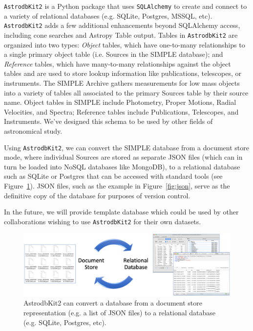 \documentclass[11pt,twoside]{article}
\begin{document}
 \texttt{AstrodbKit2} is a Python package that uses \texttt{SQLAlchemy} to create and connect to a variety of relational databases (e.g. SQLite, Postgres, MSSQL, etc). 
 \texttt{AstrodbKit2} adds a few additional enhancements beyond SQLAlchemy access, including cone searches and Astropy Table output.
 Tables in \texttt{AstrodbKit2} are organized into two types: \textit{Object} tables, which have one-to-many relationships to a single primary object table (i.e. Sources in the SIMPLE database); and \textit{Reference} tables, which have many-to-many relationships against the object tables and are used to store lookup information like publications, telescopes, or instruments. The SIMPLE Archive gathers measurements for low mass objects into a variety of tables all associated to the primary Sources table by their source name. Object tables in SIMPLE include Photometry, Proper Motions, Radial Velocities, and Spectra; Reference tables include Publications, Telescopes, and Instruments.
 We've designed this schema to be used by other fields of astronomical study.

Using \texttt{AstrodbKit2}, we can convert the SIMPLE database from a document store mode, where individual Sources are stored as separate JSON files (which can in turn be loaded into NoSQL databases like MongoDB), to a relational database such as SQLite or Postgres that can be accessed with standard tools (see Figure~\ref{fig:astrodbkit2}). JSON files, such as the example in Figure~\ref{fig:json}, serve as the definitive copy of the database for purposes of version control.

In the future, we will provide template database which could be used by other collaborations wishing to use  \texttt{AstrodbKit2} for their own datasets.

\begin{figure}
    \centering
    \includegraphics[width=\textwidth]{X0-012_f1.eps}
    \caption{AstrodbKit2 can convert a database from a document store representation (e.g. a list of JSON files) to a relational database (e.g. SQLite, Postgres, etc).}
    \label{fig:astrodbkit2}
\end{figure}
\end{document}
